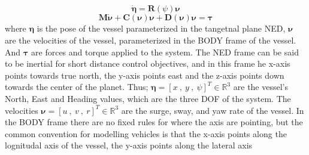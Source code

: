 \begin{equation} \label{EQ: eta_dot}
    \bm{\dot{\eta}} = \textbf{R}(\psi)\bm{\nu}    
\end{equation}
\begin{equation} \label{EQ: Vessel Dynamics}
    \textbf{M}\bm{\dot{\nu}} + \textbf{C}(\bm{\nu})\bm{\nu} + \textbf{D}(\bm{\nu})\bm{\nu} = \bm{\tau}
\end{equation} %
where $\bm{\eta}$ is the pose of the vessel parameterized in the tangetnal plane \gls{NED}, $\bm{\nu}$ are
the velocities of the vessel, parameterized in the BODY frame of the vessel. And $\bm{\tau}$ are forces and torque applied to the
system. The \gls{NED} frame can be said to be inertial for short distance control objectives, and in this frame 
he x-axis points towards true north, the y-axis points east and the z-axis points down towards the center of the planet.
Thus; $\bm{\eta} = [x\ , \ y \ , \ \psi]^T \in \mathbb{R}^{3}$ are the vessel's North, East and Heading values, 
which are the three \gls{DOF} of the system. The velocities $\bm{\nu} = [u\ , \ v \ , \ r]^T \in \mathbb{R}^{3}$ are the
surge, sway, and yaw rate of the vessel. In the BODY frame there are no fixed rules for where the axis are pointing, but the common convention for modelling
vehicles is that the x-axis points along the lognitudal axis of the vessel, the y-axis points along the lateral axis
